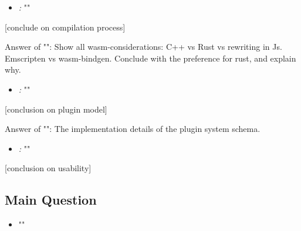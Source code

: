 \begin{itemize}[ ]
  \item \emph{\mySubRQTwoTitle:} "\mySubRQTwo"
\end{itemize}

[conclude on compilation process]

Answer of "\mySubRQTwoTitle": Show all wasm-considerations: C++ vs Rust vs rewriting in Js. Emscripten vs wasm-bindgen. Conclude with the preference for rust, and explain why.

\begin{itemize}[ ]
  \item \emph{\mySubRQThreeTitle:}  "\mySubRQThree"
\end{itemize}

[conclusion on plugin model]

Answer of "\mySubRQThreeTitle": The implementation details of the plugin system schema. 

\begin{itemize}[ ]
  \item \emph{\mySubRQFourTitle:} "\mySubRQFour"
\end{itemize}

[conclusion on usability]


\subsection*{Main Question}

\begin{itemize}[ ]
    \item "\myMainRQ"
\end{itemize}

